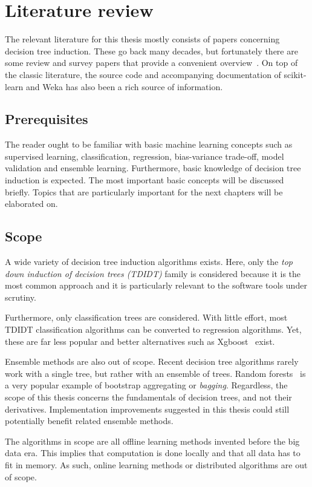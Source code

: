 \chapter{Literature review}\label{cha:literature}
The relevant literature for this thesis mostly consists of papers concerning decision tree induction. These go back many decades, but fortunately there are some review and survey papers that provide a convenient overview~\cite{murthy1998automatic, rokach2005top, kotsiantis2007supervised}. On top of the classic literature, the source code and accompanying documentation of scikit-learn and Weka has also been a rich source of information.

\section{Prerequisites}
The reader ought to be familiar with basic machine learning concepts such as supervised learning, classification, regression, bias-variance trade-off, model validation and ensemble learning. Furthermore, basic knowledge of decision tree induction is expected. The most important basic concepts will be discussed briefly. Topics that are particularly important for the next chapters will be elaborated on.

\section{Scope}
A wide variety of decision tree induction algorithms exists. Here, only the \emph{top down induction of decision trees (TDIDT)} family is considered because it is the most common approach and it is particularly relevant to the software tools under scrutiny.

Furthermore, only classification trees are considered. With little effort, most TDIDT classification algorithms can be converted to regression algorithms. Yet, these are far less popular and better alternatives such as Xgboost~\cite{xgboost} exist.

Ensemble methods are also out of scope. Recent decision tree algorithms rarely work with a single tree, but rather with an ensemble of trees. Random forests~\cite{rf} is a very popular example of bootstrap aggregating or \emph{bagging}. Regardless, the scope of this thesis concerns the fundamentals of decision trees, and not their derivatives. Implementation improvements suggested in this thesis could still potentially benefit related ensemble methods.

The algorithms in scope are all offline learning methods invented before the big data era. This implies that computation is done locally and that all data has to fit in memory. As such, online learning methods or distributed algorithms are out of scope.

